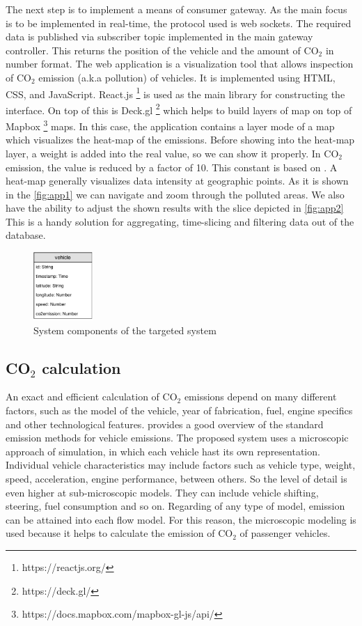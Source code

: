\documentclass[letter, 10pt, conference]{ieeeconf}
\begin{document}
The next step is to implement a means of consumer gateway.
As the main focus is to be implemented in real-time, the protocol used is web sockets.
The required data is published via subscriber topic implemented in the main gateway controller.
This returns the position of the vehicle and the amount of CO$_2$ in number format.
The web application is a visualization tool that allows inspection of CO$_2$ emission (a.k.a pollution) of vehicles.
It is implemented using HTML, CSS, and JavaScript.
React.js \footnote{https://reactjs.org/} is used as the main library for constructing the interface.
On top of this is Deck.gl \footnote{https://deck.gl/} which helps to build layers of map on top of Mapbox \footnote{https://docs.mapbox.com/mapbox-gl-js/api/} maps.
In this case, the application contains a layer mode of a map which visualizes the heat-map of the emissions.
Before showing into the heat-map layer, a weight is added into the real value, so we can show it properly.
In CO$_2$ emission, the value is reduced by a factor of 10.
This constant is based on \cite{heisig_bridging_nodate}.
A heat-map generally visualizes data intensity at geographic points.
As it is shown in the \ref{fig:app1} we can navigate and zoom through the polluted areas.
We also have the ability to adjust the shown results with the slice depicted in \ref{fig:app2}
This is a handy solution for aggregating, time-slicing and filtering data out of the database.

\begin{figure}[h]
  \centering
  \includegraphics[width=0.2\textwidth]{db_schema}
  \caption{System components of the targeted system}
  \label{fig:db_schema}
\end{figure}

\subsection{CO$_2$ calculation}

An exact and efficient calculation of CO$_2$ emissions depend on many different factors, such as the model of the vehicle, year of fabrication, fuel, engine specifics and other technological features.
\cite{potscher_co2-monitoring_2016} provides a good overview of the standard emission methods for vehicle emissions.
The proposed system uses a microscopic approach of simulation, in which each vehicle hast its own representation.
Individual vehicle characteristics may include factors such as vehicle type, weight, speed, acceleration, engine performance, between others.
So the level of detail is even higher at sub-microscopic models.
They can include vehicle shifting, steering, fuel consumption and so on.
Regarding of any type of model, emission can be attained into each flow model.
For this reason, the microscopic modeling is used because it helps to calculate the emission of CO$_2$ of passenger vehicles.
\end{document}

